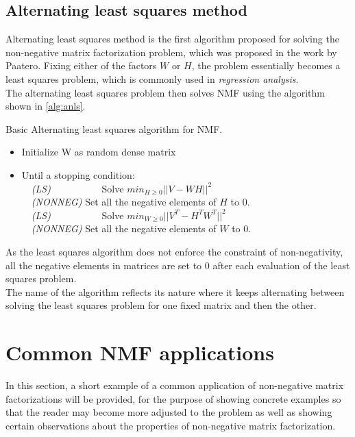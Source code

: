 \documentclass[thesis=M,english]{FITthesis}[2012/10/20]
\begin{document}
\subsection{Alternating least squares method}
Alternating least squares method is the first algorithm proposed for solving
the non-negative matrix factorization problem, which was proposed in the
work by Paatero. \cite{nmf-paatero} Fixing either of the factors $W$ or $H$,
the problem essentially becomes a least squares problem, which is commonly
used in \emph{regression analysis}.
\\

The alternating least squares problem then solves NMF using the algorithm
shown in \ref{alg:anls}.
\\

\begin{algorithm}[h]
  \caption{Basic Alternating least squares algorithm for NMF. \cite{nmf-anls}}
  \label{alg:anls}
  \begin{itemize}
    \item Initialize W as random dense matrix\\
    \item Until a stopping condition:\\
    ~~\emph{(LS)} ~~~~~~~~~~Solve $min_{H \geq 0}||V - WH||^{2}$\\
    ~~\emph{(NONNEG)} Set all the negative elements of $H$ to $0$.\\
    ~~\emph{(LS)} ~~~~~~~~~~Solve $min_{W \geq 0}||V^{T} - H^{T}W^{T}||^{2}$\\
    ~~\emph{(NONNEG)} Set all the negative elements of $W$ to $0$.\\
  \end{itemize}
\end{algorithm}

As the least squares algorithm does not enforce the constraint of non-negativity,
all the negative elements in matrices are set to $0$ after each evaluation of
the least squares problem.
\\

The name of the algorithm reflects its nature where it keeps alternating between
solving the least squares problem for one fixed matrix and then the other.

\section{Common NMF applications}
In this section, a short example of a common application of non-negative matrix
factorizations will be provided, for the purpose of showing concrete examples
so that the reader may become more adjusted to the problem as well as showing
certain observations about the properties of non-negative matrix factorization.
\\
\end{document}
